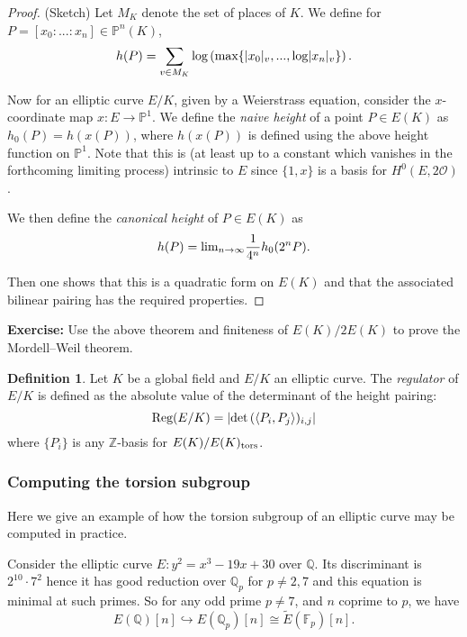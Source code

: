 \documentclass[12pt]{amsart}
\numberwithin{equation}{section}
\theoremstyle{remark}
\theoremstyle{definition}
\theoremstyle{definition}
\theoremstyle{definition}
\newtheorem{defi}[equation]{Definition}
\theoremstyle{definition}
\theoremstyle{definition}
\theoremstyle{definition}
\theoremstyle{definition}
\begin{document}
\begin{proof}(Sketch)
Let $M_K$ denote the set of places of $K$. We define for $P=[x_0:...:x_n]\in \mathbb{P}^n(K)$,
\[h(P)=\sum_{v\in M_K}\textup{log}\left(\textup{max}\{|x_0|_v,...,\textup{log}|x_n|_v\}\right).\]

Now for an elliptic curve $E/K$, given by a Weierstrass equation, consider the $x$-coordinate map $x:E\rightarrow \mathbb{P}^1$. We define the \textit{naive height} of a point $P\in E(K)$ as $h_0(P)=h(x(P))$, where $h(x(P))$ is defined using the above height function on $\mathbb{P}^1$. Note that this is (at least up to a constant which vanishes in the forthcoming limiting process) intrinsic to $E$ since $\{1,x\}$ is a basis for $H^0(E,2\mathcal{O})$.

We then define the \textit{canonical height} of $P\in E(K)$ as 
\[h(P)=\textup{lim}_{n\rightarrow \infty} \frac{1}{4^n}h_0(2^n P).\]

Then one shows that this is a quadratic form on $E(K)$ and that the associated bilinear pairing has the required properties.
\end{proof}

\textbf{Exercise:} Use the above theorem and finiteness of $E(K)/2E(K)$ to prove the Mordell--Weil theorem.

\begin{defi}
Let $K$ be a global field and $E/K$ an elliptic curve. The \textit{regulator} of $E/K$ is defined as the absolute value of the determinant of the height pairing: %
\[\textup{Reg}(E/K)=%
|\textup{det}\left (\langle P_i,P_j\right \rangle)_{i,j}|\]
where $\{P_i\}$ is any $\mathbb{Z}$-basis for $E(K)/E(K)_{\textup{tors}}$. 
\end{defi}

\subsubsection{Computing the torsion subgroup}

Here we give an example of how  the torsion subgroup of an elliptic curve may be computed in practice. 

Consider the elliptic curve $E:y^2=x^3-19x+30$ over $\mathbb{Q}$. Its discriminant is $2^{10}\cdot 7^2$ hence it has good reduction over $\mathbb{Q}_p$ for $p\neq 2,7$ and this equation is minimal at such primes. So for any odd prime $p\neq 7$, and $n$ coprime to $p$, we have
\[E(\mathbb{Q})[n]\hookrightarrow E(\mathbb{Q}_p)[n]\cong \tilde{E}(\mathbb{F}_p)[n].\]
\end{document}
